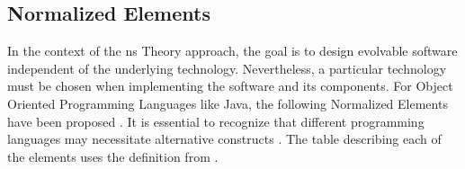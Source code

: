 \subsection{Normalized Elements} \label{subsec_ns_elements} 

In the context of the \gls{ns} Theory approach, the goal is to design evolvable software
independent of the underlying technology. Nevertheless, a particular technology must be
chosen when implementing the software and its components. For Object Oriented Programming
Languages like Java, the following Normalized Elements have been proposed
\parencite[363-398]{mannaert_normalized_2016}. It is essential to recognize that different
programming languages may necessitate alternative constructs
\parencite[364]{mannaert_normalized_2016}. The table describing each of the elements uses
the definition from \textcite{mannaert_towards_2012}.


